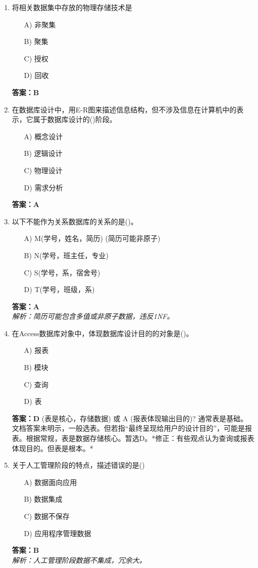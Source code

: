 \documentclass[a4paper,12pt]{article}
\begin{document}
\begin{enumerate}[label=\arabic*.]
\item 将相关数据集中存放的物理存储技术是
\begin{itemize}
    \item[A)] 非聚集
    \item[B)] 聚集
    \item[C)] 授权
    \item[D)] 回收
\end{itemize}
\textbf{答案：B}

\item 在数据库设计中，用E-R图来描述信息结构，但不涉及信息在计算机中的表示，它属于数据库设计的()阶段。
\begin{itemize}
    \item[A)] 概念设计
    \item[B)] 逻辑设计
    \item[C)] 物理设计
    \item[D)] 需求分析
\end{itemize}
\textbf{答案：A}

\item 以下不能作为关系数据库的关系的是()。
\begin{itemize}
    \item[A)] M(学号，姓名，简历) (简历可能非原子)
    \item[B)] N(学号，班主任，专业)
    \item[C)] S(学号，系，宿舍号)
    \item[D)] T(学号，班级，系)
\end{itemize}
\textbf{答案：A} \\
\textit{解析：简历可能包含多值或非原子数据，违反1NF。}

\item 在Access数据库对象中，体现数据库设计目的的对象是()。
\begin{itemize}
    \item[A)] 报表
    \item[B)] 模块
    \item[C)] 查询
    \item[D)] 表
\end{itemize}
\textbf{答案：D} (表是核心，存储数据) 或 A (报表体现输出目的)? 通常表是基础。文档答案未明示，一般选表。但若指“最终呈现给用户的设计目的”，可能是报表。根据常规，表是数据存储核心。暂选D。*修正：有些观点认为查询或报表体现目的。但表是根本。*

\item 关于人工管理阶段的特点，描述错误的是()
\begin{itemize}
    \item[A)] 数据面向应用
    \item[B)] 数据集成
    \item[C)] 数据不保存
    \item[D)] 应用程序管理数据
\end{itemize}
\textbf{答案：B} \\
\textit{解析：人工管理阶段数据不集成，冗余大。}


\end{enumerate}
\end{document}
